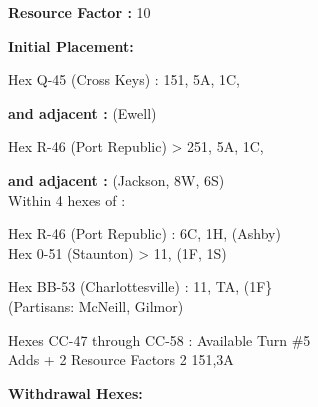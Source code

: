 \begin{scenariodata}
\textbf{Resource Factor :} 10\\
\end{scenariodata}

\begin{scenariodata}
\textbf{Initial Placement:}\\
\end{scenariodata}

\begin{scenariodata}
Hex Q-45 (Cross Keys) : 151, 5A, 1C,\\
\end{scenariodata}

\begin{scenariodata}
\textbf{and adjacent :} (Ewell)\\
\end{scenariodata}

\begin{scenariodata}
Hex R-46 (Port Republic) > 251, 5A, 1C,\\
\end{scenariodata}

\begin{scenariodata}
\textbf{and adjacent :} (Jackson, 8W, 6S)\\
Within 4 hexes of :\\
\end{scenariodata}

\begin{scenariodata}
Hex R-46 (Port Republic) : 6C, 1H, (Ashby)\\
Hex 0-51 (Staunton) > 11, (1F, 1S)\\
\end{scenariodata}

\begin{scenariodata}
Hex BB-53 (Charlottesville) : 11, TA, (1F\}\\
(Partisans: McNeill, Gilmor)\\
\end{scenariodata}

\begin{scenariodata}
Hexes CC-47 through CC-58 : Available Turn \#5\\
Adds + 2 Resource Factors 2 151,3A\\
\end{scenariodata}

\begin{scenariodata}
\textbf{Withdrawal Hexes:}\\
\end{scenariodata}

